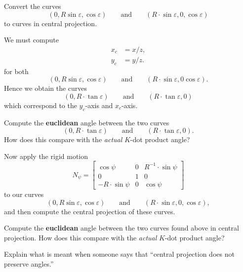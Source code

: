 \documentclass{ximera}
\begin{document}
\begin{problem}
  Convert the curves
  \[
  (0, R\sin\varepsilon,\cos\varepsilon)\qquad\text{and}\qquad(R\cdot \sin\varepsilon, 0, \cos\varepsilon)
  \]
  to curves in central projection.
  \begin{freeResponse}
    We must compute
    \begin{align*}
      x_{c} &=x/z,\\
      y_{c} &=y/z.
    \end{align*}
    for both
      \[
  (0, R\sin\varepsilon,\cos\varepsilon)\qquad\text{and}\qquad(R\cdot
      \sin\varepsilon, 0 \cos\varepsilon).
      \]
      Hence we obtain the curves
      \[
      (0,R\cdot\tan\varepsilon)\qquad\text{and}\qquad(R\cdot\tan\varepsilon,0)
      \]
      which correspond to the $y_c$-axis and $x_c$-axis.
  \end{freeResponse}
\end{problem}

\begin{problem}
  Compute the \textbf{euclidean} angle between the two curves
  \[
  (0,R\cdot\tan\varepsilon)\qquad\text{and}\qquad(R\cdot\tan\varepsilon,0).
  \]
How does this compare with the \textit{actual} $K$-dot product angle?
\end{problem}

\begin{problem}
  Now apply the rigid motion
  \[
  N_\psi=
 \begin{bmatrix}
   \cos\psi & 0 & R^{-1}\cdot\sin\psi\\
   0 & 1 & 0\\
   -R\cdot\sin\psi & 0 & \cos\psi
 \end{bmatrix}
 \]
 to our curves
 \[
 (0, R\sin\varepsilon,\cos\varepsilon)\qquad\text{and}\qquad(R\cdot
 \sin\varepsilon, 0, \cos\varepsilon),
 \]
 and then compute the central projection of these curves.
\end{problem}

\begin{problem}
  Compute the \textbf{euclidean} angle between the two curves found
  above in central projection.  How does this compare with the
  \textit{actual} $K$-dot product angle?
\end{problem}

\begin{problem}
  Explain what is meant when someone says that ``central projection
  does not preserve angles.''
\end{problem}
\end{document}
